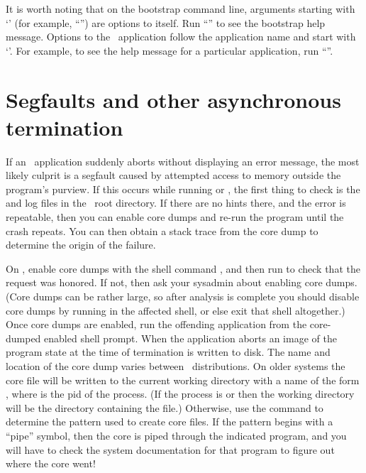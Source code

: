 It is worth noting that on the bootstrap command line, arguments
starting with `\cd{+}' (for example, ``'') are options to
 itself. Run ``'' to see the
bootstrap help message. Options to the \OOMMF\ application follow the
application name and start with `\cd{-}'.  For example, to see the help
message for a particular application, run
``''.


\section{Segfaults and other asynchronous termination}\label{sec:debug:segfaults}
If an \OOMMF\ application suddenly aborts without displaying an error
message, the most likely culprit is a segfault caused by attempted
access to memory outside the program's purview. If this occurs while
running  or , the first thing to check is the
 and  log files in the \OOMMF\ root
directory. If there are no hints there, and the error is repeatable,
then you can enable core dumps and re-run the program until the crash
repeats. You can then obtain a stack trace from the core dump to
determine the origin of the failure.

On \Linux, enable core dumps with the shell command , and then run  to check that the
request was honored. If not, then ask your sysadmin about enabling core
dumps. (Core dumps can be rather large, so after analysis is complete
you should disable core dumps by running  in the
affected shell, or else exit that shell altogether.) Once core dumps are
enabled, run the offending application from the core-dumped enabled
shell prompt. When the application aborts an image of the program state
at the time of termination is written to disk. The name and location of
the core dump varies between \Linux\ distributions. On older systems the
core file will be written to the current working directory with a name
of the form , where  is the pid of the
process. (If the process is  or  then the working
directory will be the directory containing the  file.)
Otherwise, use the command  to determine
the pattern used to create core files. If the pattern begins with a
\cd{|} ``pipe'' symbol, then the core is piped through the indicated
program, and you will have to check the system documentation for that
program to figure out where the core went!

